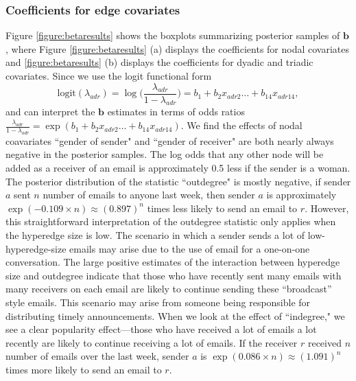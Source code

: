 \documentclass[ba]{imsart}
\numberwithin{equation}{section}
\theoremstyle{plain}
\begin{document}
	\subsubsection{Coefficients for edge covariates}
	Figure \ref{figure:betaresults} shows the boxplots summarizing posterior samples of $\boldsymbol{b}$, where Figure \ref{figure:betaresults} (a) displays the coefficients for nodal covariates and \ref{figure:betaresults} (b) displays the coefficients for dyadic and triadic covariates. Since we use the logit functional form 
	\begin{equation*}
		\mbox{logit}(\lambda_{adr})=\log\Big(\frac{\lambda_{adr}}{1-\lambda_{adr}}\Big) =b_{1}+b_{2} x_{adr2}\ldots+b_{14}x_{adr14},
	\end{equation*}
	and can interpret the $\boldsymbol{b}$ estimates in terms of odds ratios $\frac{\lambda_{adr}}{1-\lambda_{adr}}=\exp(b_{1}+b_{2} x_{adr2}\ldots+b_{14}x_{adr14})$.
	We find the effects of nodal coavariates ``gender of sender" and ``gender of receiver" are both nearly always negative in the posterior samples. The log odds that any other node will be added as a receiver of an email is approximately 0.5 less if the sender is a woman. The posterior distribution of the statistic ``outdegree" is mostly negative, if sender $a$ sent $n$ number of emails to anyone last week, then sender $a$ is approximately $\exp(-0.109\times n)\approx(0.897)^n$ times less likely to send an email to $r$. However, this straightforward interpretation of the outdegree statistic only applies when the hyperedge size is low. The scenario in which a sender sends a lot of low-hyperedge-size emails may arise due to the use of email for a one-on-one conversation. The large positive estimates of the interaction between hyperedge size and outdegree indicate that those who have recently sent many emails with many receivers on each email are likely to continue sending these ``broadcast'' style emails. This scenario may arise from someone being responsible for distributing timely announcements. When we look at the effect of ``indegree," we see a clear popularity effect---those who have received a lot of emails a lot recently are likely to continue receiving a lot of emails. If the receiver $r$ received $n$ number of emails over the last week, sender $a$ is $\exp(0.086\times n)\approx(1.091)^n $ times more likely to send an email to $r$. 
		
\end{document}
